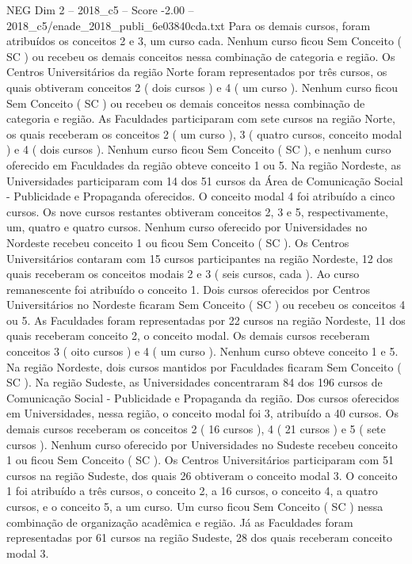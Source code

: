 \begin{textsample}{NEG Dim 2 – 2018\_c5 – Score -2.00 – 2018\_c5/enade\_2018\_publi\_6e03840cda.txt}
Para os demais cursos, foram atribuídos os conceitos 2 e 3, um curso cada.
Nenhum curso ficou Sem Conceito ( SC ) ou recebeu os demais conceitos nessa combinação de categoria e região.
Os Centros Universitários da região Norte foram representados por três cursos, os quais obtiveram conceitos 2 ( dois cursos ) e 4 ( um curso ).
Nenhum curso ficou Sem Conceito ( SC ) ou recebeu os demais conceitos nessa combinação de categoria e região.
As Faculdades participaram com sete cursos na região Norte, os quais receberam os conceitos 2 ( um curso ), 3 ( quatro cursos, conceito modal ) e 4 ( dois cursos ).
Nenhum curso ficou Sem Conceito ( SC ), e nenhum curso oferecido em Faculdades da região obteve conceito 1 ou 5.
Na região Nordeste, as Universidades participaram com 14 dos 51 cursos da Área de Comunicação Social - Publicidade e Propaganda oferecidos.
O conceito modal 4 foi atribuído a cinco cursos.
Os nove cursos restantes obtiveram conceitos 2, 3 e 5, respectivamente, um, quatro e quatro cursos.
Nenhum curso oferecido por Universidades no Nordeste recebeu conceito 1 ou ficou Sem Conceito ( SC ).
Os Centros Universitários contaram com 15 cursos participantes na região Nordeste, 12 dos quais receberam os conceitos modais 2 e 3 ( seis cursos, cada ).
Ao curso remanescente foi atribuído o conceito 1.
Dois cursos oferecidos por Centros Universitários no Nordeste ficaram Sem Conceito ( SC ) ou recebeu os conceitos 4 ou 5.
As Faculdades foram representadas por 22 cursos na região Nordeste, 11 dos quais receberam conceito 2, o conceito modal.
Os demais cursos receberam conceitos 3 ( oito cursos ) e 4 ( um curso ).
Nenhum curso obteve conceito 1 e 5.
Na região Nordeste, dois cursos mantidos por Faculdades ficaram Sem Conceito ( SC ).
Na região Sudeste, as Universidades concentraram 84 dos 196 cursos de Comunicação Social - Publicidade e Propaganda da região.
Dos cursos oferecidos em Universidades, nessa região, o conceito modal foi 3, atribuído a 40 cursos.
Os demais cursos receberam os conceitos 2 ( 16 cursos ), 4 ( 21 cursos ) e 5 ( sete cursos ).
Nenhum curso oferecido por Universidades no Sudeste recebeu conceito 1 ou ficou Sem Conceito ( SC ).
Os Centros Universitários participaram com 51 cursos na região Sudeste, dos quais 26 obtiveram o conceito modal 3.
O conceito 1 foi atribuído a três cursos, o conceito 2, a 16 cursos, o conceito 4, a quatro cursos, e o conceito 5, a um curso.
Um curso ficou Sem Conceito ( SC ) nessa combinação de organização acadêmica e região.
Já as Faculdades foram representadas por 61 cursos na região Sudeste, 28 dos quais receberam conceito modal 3.

\end{textsample}
